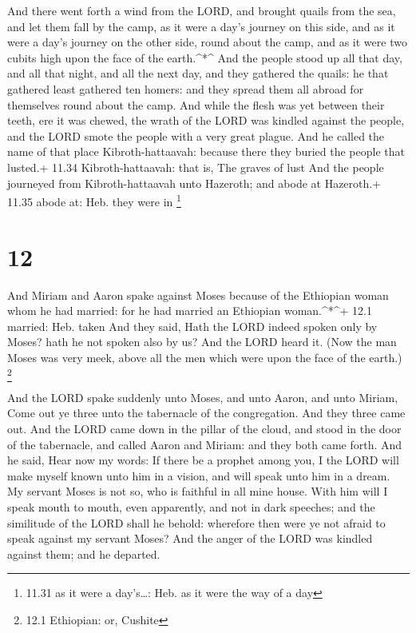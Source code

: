  And there went forth a wind from the LORD, and brought
quails from the sea, and let them fall by the camp, as it were a day's
journey on this side, and as it were a day's journey on the other side,
round about the camp, and as it were two cubits high upon the face of
the earth.\^{}*\^{}  And the people stood up all that day,
and all that night, and all the next day, and they gathered the quails:
he that gathered least gathered ten homers: and they spread them all
abroad for themselves round about the camp.  And while the
flesh was yet between their teeth, ere it was chewed, the wrath of the
LORD was kindled against the people, and the LORD smote the people with
a very great plague.  And he called the name of that place
Kibroth-hattaavah: because there they buried the people that lusted.+
11.34 Kibroth-hattaavah: that is, The graves of lust  And
the people journeyed from Kibroth-hattaavah unto Hazeroth; and abode at
Hazeroth.+ 11.35 abode at: Heb. they were in \footnote{11.31 as it were
  a day's\ldots: Heb. as it were the way of a day}

\hypertarget{section-11}{%
\section{12}\label{section-11}}

 And Miriam and Aaron spake against Moses because of the
Ethiopian woman whom he had married: for he had married an Ethiopian
woman.\^{}*\^{}+ 12.1 married: Heb. taken  And they said,
Hath the LORD indeed spoken only by Moses? hath he not spoken also by
us? And the LORD heard it.  (Now the man Moses was very
meek, above all the men which were upon the face of the earth.)
\footnote{12.1 Ethiopian: or, Cushite}

 And the LORD spake suddenly unto Moses, and unto Aaron, and
unto Miriam, Come out ye three unto the tabernacle of the congregation.
And they three came out.  And the LORD came down in the
pillar of the cloud, and stood in the door of the tabernacle, and called
Aaron and Miriam: and they both came forth.  And he said,
Hear now my words: If there be a prophet among you, I the LORD will make
myself known unto him in a vision, and will speak unto him in a dream.
 My servant Moses is not so, who is faithful in all mine
house.  With him will I speak mouth to mouth, even
apparently, and not in dark speeches; and the similitude of the LORD
shall he behold: wherefore then were ye not afraid to speak against my
servant Moses?  And the anger of the LORD was kindled
against them; and he departed.


